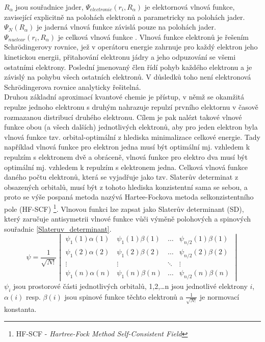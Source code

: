 \documentclass[
digital, %
table,   %
lof,     %
lot,     %
oneside,
]{fithesis3}
\begin{document}
$R_{\alpha}$ jsou souřadnice jader, $\Psi_{electronic}(r_i,R_{\alpha})$ je elektornová vlnová funkce, zavisející explicitně na polohách elektronů a parametricky na polohách jader. $\Psi_N(R_{\alpha})$ je jaderná vlnová funkce závislá pouze na polohách jader. $ \Psi_{nuclear}(r_i, R_{\alpha}) $ je celková vlnová funkce \cite{lechamolecularmodeling}.
Vlnová funkce elektronů je řešením Schrödingerovy rovnice, jež v operátoru energie zahrnuje pro každý elektron jeho kinetickou energii, přitahování elektronu jádry a jeho odpuzování se všemi ostatními elektrony. Poslední jmenovaný člen řídí pohyb každého elektronu a je závislý na pohybu všech ostatních elektronů. V důsledků toho není elektronová Schrödingerova rovnice analyticky řešitelná. \\

Druhou základní aproximací kvantové chemie je přístup, v němž se okamžitá repulze jednoho elektronu s druhým nahrazuje repulzí prvního elektornu v časově rozmazanou distribucí druhého elektronu. Cílem je pak nalézt takové vlnové funkce obou (a všech dalších) jednotlivých elektronů, aby pro jeden elektron byla vlnová funkce tzv. orbital-optimální z hlediska minimalizace celkové energie. Tady například vlnová funkce pro elektron jedna musí být optimální mj. vzhledem k repulzím s elektronem dvě a obráceně, vlnová funkce pro elektro dva musí být optimální mj. vzhledem k repulzím s elektronem jedna. Celková vlnová funkce daného počtu elektronů, která se vyjadřuje jako tzv. Slaterův determinat z obsazených orbitalů, musí být z tohoto hlediska konzistentní sama se sebou, a proto se výše pospaná metoda nazývá Hartee-Fockova metoda selkonzistentního pole (HF-SCF) \footnote{HF-SCF - \textit{Hartree-Fock Method Self-Consistent Field}}. Vlnovou funkci lze zapsat jako Slaterův determinant (SD), který zaručuje antisymetrii vlnové funkce vůči výměně polohových a spinových souřadnic \ref{Slateruv_determinant}.
\begin{equation}
\psi =  \frac{1}{\sqrt{N!}}\begin{vmatrix}
\psi_1(1)\alpha(1) & \psi_1(1) \beta (1)  & \dots & \psi_{n/2}(1)\beta(1) \\
\psi_1(2)\alpha(2) & \psi_1(2) \beta (2) & \dots & \psi_{n/2}(2)\beta(2) \\
\vdots             & \vdots                           & \ddots & \vdots \\
\psi_1(n)\alpha(n) & \psi_1(n) \beta (n) & \dots & \psi_{n/2}(n)\beta(n)
\end{vmatrix}
\label{Slateruv_determinant}
\end{equation}
$\psi_i$ jsou prostorové části jednotlivých orbitalů, 1,2,\dots n jsou jednotlivé elektrony $i$, $\alpha(i)$ resp. $\beta(i)$ jsou spinové funkce těchto elektronů a $\frac{1}{\sqrt{N!}}$ je normovací konstanta.
\end{document}
